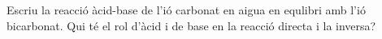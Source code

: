 \begin{exr}{}
Escriu la reacció àcid-base de l'ió carbonat en aigua en equlibri amb l'ió bicarbonat. Qui té el rol d'àcid i de base en la reacció directa i la inversa?
\end{exr}
